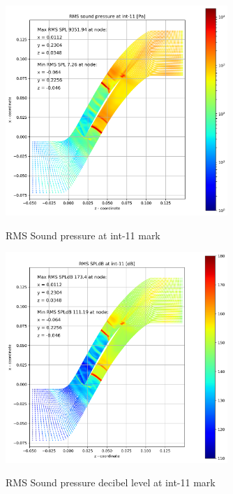 \begin{figure}[ht]
  \centering
  \includegraphics[width=0.75\textwidth]{Figures/int-11-rms-spl.png} \label{int-11-rms-spl}
  \caption{RMS Sound pressure at int-11 mark}
  
  \vspace*{\floatsep}%

  \includegraphics[width=0.75\textwidth]{Figures/int-11-rms-spldb.png} \label{int-11-rms-spldb}
  \caption{RMS Sound pressure decibel level at int-11 mark}
\end{figure}
